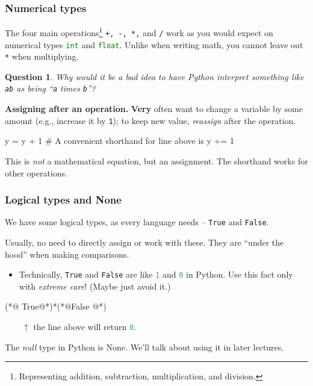 \documentclass{beamer}
\newenvironment{codeblock}
    {\hfill\begin{beamerboxesrounded}[lower=codecol, width=0.8\textwidth]
    \medskip

    }
    { 
    \end{beamerboxesrounded}\hfill
    }
\theoremstyle{example}
\newtheorem{question}{Question}
\newcommand{\ct}[1]{\lstinline[language=Python]!#1!}
\newcommand{\ttt}[1]{\texttt{#1}}
\begin{document}
\begin{frame}[fragile]
\frametitle{Numerical types}

The four main operations\footnote{Representing addition, subtraction, multiplication, and division.} \ttt{+, -, *,} and \ttt{/} work as you would expect on numerical types \ct{int} and \ct{float}. Unlike when writing math, you cannot leave out \ttt{*} when multiplying.

\pause
\begin{question} Why would it be a \emph{bad} idea to have Python interpret something like \ttt{ab} as being ``\ttt{a} times \ttt{b}''?
\end{question}

\pause

{\bf \color{mygreen} Assigning after an operation.} {\bf Very} often want to change a variable by some amount (e.g., increase it by \ttt{1}); to keep new value, \emph{reassign} after the operation.

\begin{codeblock}

\begin{python}
y = y + 1
# A convenient shorthand for line above is
y += 1
\end{python}

\end{codeblock}

\pause
This is \emph{not} a mathematical equation, but an assignment. The shorthand works for other operations.
\end{frame}

\begin{frame}[fragile]
\frametitle{Logical types and {\ttm None}}

We have some logical types, as every language needs {--} \ttt{True} and \ttt{False}. 

Usually, no need to directly assign or work with these. They are ``under the hood'' when making comparisons. 
\pause
\begin{itemize}
	\item Technically, \ttt{True} and \ttt{False} are like \ct{1} and \ct{0} in Python. Use this fact only with \emph{extreme care}! (Maybe just avoid it.)
\end{itemize}
\begin{codeblock}

\begin{python}
(*@ \color{strings}True@*)*(*@\color{strings}False @*)
\end{python}

\end{codeblock}

$\qquad \uparrow$ the line above will return \ct{0}.
\vspace*{12pt}

\pause
The \emph{null} type in Python is {\ttm None}. We'll talk about using it in later lectures.
\end{frame}
\end{document}
